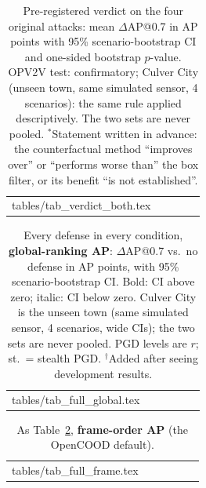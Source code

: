 \documentclass[conference]{IEEEtran}
\makeatletter
\newcommand{\tabin}[1]{\@@input #1 }
\makeatother
\begin{document}
\begin{table}[!t]
\caption{Pre-registered verdict on the four original attacks: mean $\Delta$AP@0.7 in AP points with 95\%
scenario-bootstrap CI and one-sided bootstrap $p$-value. OPV2V test: confirmatory; Culver City (unseen town, same
simulated sensor, 4 scenarios): the same rule applied descriptively. The two sets are never pooled.
$^\ast$Statement written in advance: the counterfactual method ``improves over'' or ``performs worse than'' the box
filter, or its benefit ``is not established''.}
\label{tab:verdict}
\centering
\footnotesize
\setlength{\tabcolsep}{6pt}
\begin{tabular}{@{}lcccc@{}}
\toprule
\tabin{tables/tab_verdict_both.tex}
\bottomrule
\end{tabular}
\end{table}

\begin{table}[!t]
\caption{Every defense in every condition, \textbf{global-ranking AP}: $\Delta$AP@0.7 vs.\ no defense in AP
points, with 95\% scenario-bootstrap CI. Bold: CI above zero; italic: CI below zero. Culver City is the unseen
town (same simulated sensor, 4 scenarios, wide CIs); the two sets are never pooled. PGD levels are $r$; st.\ =
stealth PGD. $^\dagger$Added after seeing development results.}
\label{tab:full-g}
\centering
\scriptsize
\setlength{\tabcolsep}{3pt}
\begin{tabular}{@{}lccccc@{}}
\toprule
\tabin{tables/tab_full_global.tex}
\bottomrule
\end{tabular}
\end{table}

\begin{table}[!t]
\caption{As Table~\ref{tab:full-g}, \textbf{frame-order AP} (the OpenCOOD default).}
\label{tab:full-f}
\centering
\scriptsize
\setlength{\tabcolsep}{3pt}
\begin{tabular}{@{}lccccc@{}}
\toprule
\tabin{tables/tab_full_frame.tex}
\bottomrule
\end{tabular}
\end{table}
\end{document}
